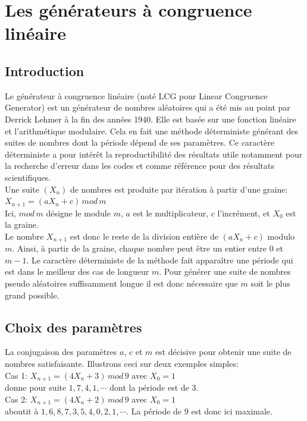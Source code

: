 \documentclass{scrartcl}
\begin{document}
\section{Les générateurs à congruence linéaire}
\subsection{Introduction}
Le générateur à congruence linéaire (noté LCG pour Linear Congruence Generator) est un générateur de nombres aléatoires qui a été mis au point par Derrick Lehmer à la fin des années 1940. Elle est basée sur une fonction linéaire et l'arithmétique modulaire. Cela en fait une méthode déterministe générant des suites de nombres dont la période dépend de ses paramètres.
Ce caractère déterministe a pour intérêt la reproductibilité des résultats utile notamment pour la recherche d'erreur dans les codes et comme référence pour des résultats scientifiques.\\
Une suite $(X_n)$ de nombres est produite par itération à partir d'une graine:\linebreak
$X_{n+1} = (a X_n +c)\, mod\, m$\\
Ici, $mod \, m$ désigne le module $m$,
$a$ est le multiplicateur,
$c$ l'incrément,
et $X_0$ est la graine. \\

Le nombre $X_{n+1}$ est donc le reste de la division entière de $(a X_n +c)$ modulo $m$. Ainsi, à partir de la graine, chaque nombre peut être un entier entre 0 et $m-1$.
Le caractère déterministe de la méthode fait apparaître une période qui est dans le meilleur des cas de longueur $m$.
Pour générer une suite de nombres pseudo aléatoires suffisamment longue il est donc nécessaire que $m$ soit le plus grand possible.

\subsection{Choix des paramètres}
La conjugaison des paramètres $a$, $c$ et $m$ est décisive pour obtenir une suite de nombres satisfaisante. Illustrons ceci sur deux exemples simples:\\

Cas 1: $X_{n+1} = (4 X_n + 3)\, mod\, 9$ avec $X_0 = 1$\\
donne pour suite $1,7,4,1, \cdots$ dont la période est de 3.\\
Cas 2: $X_{n+1} = (4 X_n +2)\, mod\, 9$ avec $X_0 = 1$\\ aboutit à $1,6,8,7,3,5,4,0,2,1, \cdots$. La période de 9 est donc ici maximale.\\
\end{document}
